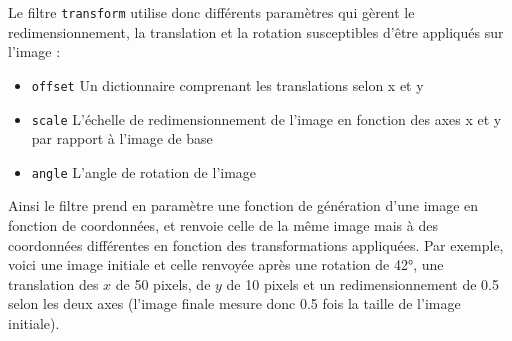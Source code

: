 \documentclass[11pt]{article}
\begin{document}
Le filtre \texttt{transform} utilise donc différents paramètres qui gèrent le redimensionnement, la translation et la rotation susceptibles d'être appliqués sur l'image :
\begin{itemize}
    \item \texttt{offset} Un dictionnaire comprenant les translations selon x et y
    \item \texttt{scale} L'échelle de redimensionnement de l'image en fonction des axes x et y par rapport à l'image de base
    \item \texttt{angle} L'angle de rotation de l'image \\
\end{itemize}

Ainsi le filtre prend en paramètre une fonction de génération d'une image en fonction de coordonnées, et renvoie celle de la même image mais à des coordonnées différentes en fonction des transformations appliquées. Par exemple, voici une image initiale et celle renvoyée après une rotation de 42°, une translation des $x$ de 50 pixels, de $y$ de 10 pixels et un redimensionnement de 0.5 selon les deux axes (l'image finale mesure donc 0.5 fois la taille de l'image initiale). \\
\end{document}
